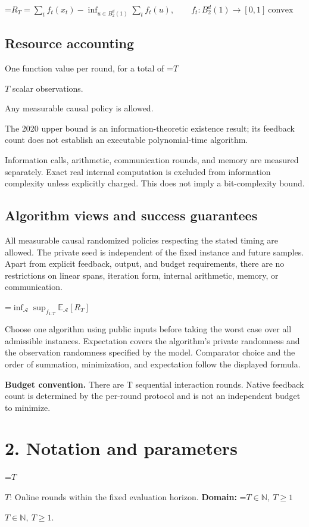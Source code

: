 \documentclass[10pt,a4paper]{article}
\newcommand{\AtlasMath}[1]{\par\begingroup\centering\setbox0=\hbox{$\displaystyle #1$}\ifdim\wd0>1.4\linewidth\typeout{ATLAS WIDE FORMULA: \the\wd0}\fi\ifdim\wd0>\linewidth\resizebox{\linewidth}{!}{\box0}\else\box0\fi\par\endgroup}
\newcommand{\AtlasInlineMath}[1]{\begingroup\setbox0=\hbox{$#1$}\ifdim\wd0>.4\linewidth\endgroup\AtlasMath{#1}\else\endgroup$#1$\fi}
\begin{document}
\AtlasMath{R_T=\sum_t f_t(x_t)-\inf_{u\in B_2^d(1)}\sum_t f_t(u),\qquad f_t:B_2^d(1)\to[0,1]\ \mathrm{convex}}


\subsection{Resource accounting}
One function value per round, for a total of \AtlasInlineMath{T} scalar observations.

Any measurable causal policy is allowed.

The 2020 upper bound is an information-theoretic existence result; its feedback count does not establish an executable polynomial-time algorithm.

Information calls, arithmetic, communication rounds, and memory are measured separately. Exact real internal computation is excluded from information complexity unless explicitly charged. This does not imply a bit-complexity bound.

\subsection{Algorithm views and success guarantees}
All measurable causal randomized policies respecting the stated timing are allowed. The private seed is independent of the fixed instance and future samples. Apart from explicit feedback, output, and budget requirements, there are no restrictions on linear spans, iteration form, internal arithmetic, memory, or communication.


\AtlasMath{\inf_{\mathcal{A}}\sup_{f_{1:T}}\mathbb{E}_{\mathcal{A}}[R_T]}


Choose one algorithm using public inputs before taking the worst case over all admissible instances. Expectation covers the algorithm's private randomness and the observation randomness specified by the model. Comparator choice and the order of summation, minimization, and expectation follow the displayed formula.

\textbf{Budget convention.} There are T sequential interaction rounds. Native feedback count is determined by the per-round protocol and is not an independent budget to minimize.

\section{2. Notation and parameters}
\AtlasInlineMath{T}: Online rounds within the fixed evaluation horizon. \textbf{Domain:} \AtlasInlineMath{T\in\mathbb N,\ T\ge1}.
\end{document}
